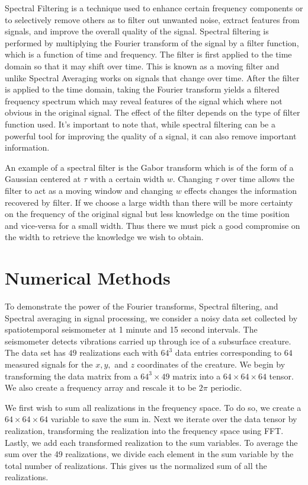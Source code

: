 \documentclass[12pt]{article}%
\numberwithin{equation}{subsection}
\begin{document}
Spectral Filtering is a technique used to enhance certain frequency components or to selectively remove others as to filter out unwanted noise, extract features from signals, and improve the overall quality of the signal. Spectral filtering is performed by multiplying the Fourier transform of the signal by a filter function, which is a function of time and frequency. The filter is first applied to the time domain so that it may shift over time. This is known as a moving filter and unlike Spectral Averaging works on signals that change over time. After the filter is applied to the time domain, taking the Fourier transform yields a filtered frequency spectrum which may reveal features of the signal which where not obvious in the original signal. The effect of the filter depends on the type of filter function used. It's important to note that, while spectral filtering can be a powerful tool for improving the quality of a signal, it can also remove important information. 

An example of a spectral filter is the Gabor transform which is of the form of a Gaussian centered at $\tau$ with a certain width $w$. Changing $\tau$ over time allows the filter to act as a moving window and changing $w$ effects changes the information recovered by filter. If we choose a large width than there will be more certainty on the frequency of the original signal but less knowledge on the time position and vice-versa for a small width. Thus there we must pick a good compromise on the width to retrieve the knowledge we wish to obtain.


\section{Numerical Methods}


To demonstrate the power of the Fourier transforms, Spectral filtering, and Spectral averaging in signal processing, we consider a noisy data set collected by spatiotemporal seismometer at 1 minute and 15 second intervals. The seismometer detects vibrations carried up through ice of a subsurface creature. The data set has $49$ realizations each with $64^3$ data entries corresponding to $64$ measured signals for the $x,y,$ and $z$ coordinates of the creature. We begin by transforming the data matrix from a $64^3 \times 49$ matrix into a $64 \times 64 \times 64$ tensor. We also create a frequency array and rescale it to be $2\pi$ periodic. 

We first wish to sum all realizations in the frequency space. To do so, we create a $64 \times 64 \times 64$ variable to save the sum in. Next we iterate over the data tensor by realization, transforming the realization into the frequency space using FFT. Lastly, we add each transformed realization to the sum variables. To average the sum over the 49 realizations, we divide each element in the sum variable by the total number of realizations. This gives us the normalized sum of all the realizations. 
\end{document}
